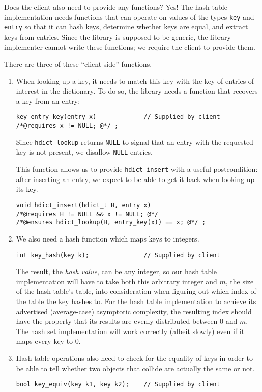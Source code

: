 Does the client also need to provide any functions?  Yes!  The hash
table implementation needs functions that can operate on values of the
types \lstinline'key' and \lstinline'entry' so that it can hash keys,
determine whether keys are equal, and extract keys from entries.
Since the library is supposed to be generic, the library implementer
cannot write these functions; we require the client to provide them.

There are three of these ``client-side'' functions.
\begin{enumerate}
\item%
  When looking up a key, it needs to match this key with the key of
  entries of interest in the dictionary.  To do so, the library needs
  a function that recovers a key from an entry:
\begin{lstlisting}[language={[C0]C}]
key entry_key(entry x)             // Supplied by client
/*@requires x != NULL; @*/ ;
\end{lstlisting}
Since \lstinline'hdict_lookup' returns \lstinline'NULL' to signal that
an entry with the requested key is not present, we disallow
\lstinline'NULL' entries.

This function allows us to provide \lstinline'hdict_insert' with a
useful postcondition: after inserting an entry, we expect to be able
to get it back when looking up its key.
\begin{lstlisting}[language={[C0]C}]
void hdict_insert(hdict_t H, entry x)
/*@requires H != NULL && x != NULL; @*/
/*@ensures hdict_lookup(H, entry_key(x)) == x; @*/ ;
\end{lstlisting}

\item%
  We also need a hash function which maps keys to integers.
\begin{lstlisting}[language={[C0]C}]
int key_hash(key k);               // Supplied by client
\end{lstlisting}
The result, the \emph{hash value}, can be any integer, so our hash
table implementation will have to take both this arbitrary integer and
$m$, the size of the hash table's table, into consideration when
figuring out which index of the table the key hashes to.  For the hash
table implementation to achieve its advertised (average-case)
asymptotic complexity, the resulting index should have the property
that its results are evenly distributed between $0$ and $m$.  The hash
set implementation will work correctly (albeit slowly) even if it maps
every key to $0$.

\item%
  Hash table operations also need to check for the equality of keys in
  order to be able to tell whether two objects that collide are
  actually the same or not.
\begin{lstlisting}[language={[C0]C}]
bool key_equiv(key k1, key k2);    // Supplied by client
\end{lstlisting}


\end{enumerate}
